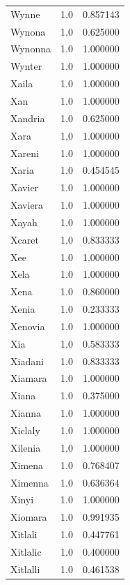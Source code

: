 \documentclass[
  letterpaper,
  DIV=11,
  numbers=noendperiod]{scrreprt}
\begin{document}
\begin{tabular}{lrr}
Wynne           &   1.0 &   0.857143 \\
Wynona          &   1.0 &   0.625000 \\
Wynonna         &   1.0 &   1.000000 \\
Wynter          &   1.0 &   1.000000 \\
Xaila           &   1.0 &   1.000000 \\
Xan             &   1.0 &   1.000000 \\
Xandria         &   1.0 &   0.625000 \\
Xara            &   1.0 &   1.000000 \\
Xareni          &   1.0 &   1.000000 \\
Xaria           &   1.0 &   0.454545 \\
Xavier          &   1.0 &   1.000000 \\
Xaviera         &   1.0 &   1.000000 \\
Xayah           &   1.0 &   1.000000 \\
Xcaret          &   1.0 &   0.833333 \\
Xee             &   1.0 &   1.000000 \\
Xela            &   1.0 &   1.000000 \\
Xena            &   1.0 &   0.860000 \\
Xenia           &   1.0 &   0.233333 \\
Xenovia         &   1.0 &   1.000000 \\
Xia             &   1.0 &   0.583333 \\
Xiadani         &   1.0 &   0.833333 \\
Xiamara         &   1.0 &   1.000000 \\
Xiana           &   1.0 &   0.375000 \\
Xianna          &   1.0 &   1.000000 \\
Xiclaly         &   1.0 &   1.000000 \\
Xilenia         &   1.0 &   1.000000 \\
Ximena          &   1.0 &   0.768407 \\
Ximenna         &   1.0 &   0.636364 \\
Xinyi           &   1.0 &   1.000000 \\
Xiomara         &   1.0 &   0.991935 \\
Xitlali         &   1.0 &   0.447761 \\
Xitlalic        &   1.0 &   0.400000 \\
Xitlalli        &   1.0 &   0.461538 \\

\end{tabular}
\end{document}
